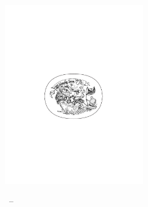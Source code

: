 \begin{titlepage}
\begin{addmargin}[-10mm]{-30mm}  %
\large
\hfill

\vfill{}


\begin{center}
\begingroup \color{Maroon} \spacedallcaps{\myTitle} \endgroup\\
\bigskip{}
\spacedlowsmallcaps{\myName}\\
\vfill{}

\par\end{center}

\begin{center}
\includegraphics[width=6cm]{gfx/TFZsuperellipse_bw}\\
 \medskip{}

\par\end{center}

\begin{center}
\mySubtitle
\par\end{center}

\medskip{}


\begin{center}
\myTime\ --\ \myVersion
\par\end{center}

\vfill{}


\end{addmargin} 
\end{titlepage} 
